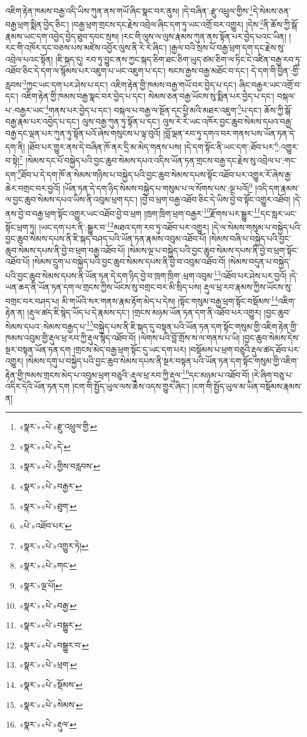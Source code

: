 འཇིག་རྟེན་ཁམས་བརྒྱ་འདི་ཡིས་ཀུན་ནས་གཡོ་ཞིང་སྣང་བར་ནུས། །དེ་བཞིན་:རྫུ་འཕྲུལ་གྱིས་\footnote{«སྣར་»«པེ་»རྫུ་འཕྲུལ་གྱི་}དེ་སེམས་ཅན་བརྒྱ་ཕྲག་སྨིན་བྱེད་ཅིང་། །བརྒྱ་ཕྲག་གྲངས་དང་རྗེས་འབྲེལ་ཞིང་དག་ཏུ་ཡང་འགྲོ་བར་འགྱུར། །དེས་\footnote{«སྣར་»«པེ་»དེ་}ནི་ཆོས་ཀྱི་སྒོ་རྣམས་ཡང་དག་འབྱེད་བྱེད་ཐུབ་དབང་སྲས། །རང་གི་ལུས་ལ་ལུས་རྣམས་ཀུན་ནས་སྟོན་པར་བྱེད་པའང་ཡིན། །རང་གི་འཁོར་དང་བཅས་པས་མཛེས་འབྱོར་ལུས་ནི་རེ་རེ་ཞིང་། །རྒྱལ་བའི་སྲས་པོ་བརྒྱ་ཕྲག་དག་དང་རྗེས་སུ་འབྲེལ་པའང་སྟོན། །ཇི་སྐད་དུ། རབ་ཏུ་བྱུང་ནས་ཀྱང་སྐད་ཅིག་ཐང་ཅིག་ཡུད་ཙམ་ཅིག་ལ་ཏིང་ངེ་འཛིན་བརྒྱ་རབ་ཏུ་འཐོབ་ཅིང་དེ་དག་ལ་སྙོམས་པར་འཇུག་པ་ཡང་འཇུག་པ་དང་། སངས་རྒྱས་བརྒྱ་མཐོང་བ་དང་། དེ་དག་གི་བྱིན་:གྱི་རླབས་\footnote{«སྣར་»«པེ་»གྱིས་བརླབས་}ཀྱང་ཡང་དག་པར་ཤེས་པ་དང་། འཇིག་རྟེན་གྱི་ཁམས་བརྒྱ་གཡོ་བར་བྱེད་པ་དང་། ཞིང་བརྒྱར་ཡང་འགྲོ་བ་དང་། འཇིག་རྟེན་གྱི་ཁམས་བརྒྱ་སྣང་བར་བྱེད་པ་དང་། སེམས་ཅན་བརྒྱ་ཡོངས་སུ་སྨིན་པར་བྱེད་པ་དང་། བསྐལ་པ་:བརྒྱར་ཡང་\footnote{«སྣར་»«པེ་»བརྒྱར་}གནས་པར་བྱེད་པ་དང་། བསྐལ་པ་བརྒྱ་ལ་སྔོན་དང་ཕྱི་མའི་མཐར་འཇུག་\footnote{«སྣར་»«པེ་»ཐུག་}པ་དང་། ཆོས་ཀྱི་སྒོ་བརྒྱ་རྣམ་པར་འབྱེད་པ་དང་། ལུས་བརྒྱ་ཀུན་ཏུ་སྟོན་པ་དང་། ལུས་རེ་རེ་ཡང་འཁོར་བྱང་ཆུབ་སེམས་དཔའ་བརྒྱ་བརྒྱ་དང་ལྡན་པར་ཀུན་ཏུ་སྟོན་པའོ་ཞེས་གསུངས་པ་ལྟ་བུའོ། །བློ་ལྡན་རབ་ཏུ་དགའ་བར་གནས་པས་ཡོན་ཏན་དེ་དག་ནི། །ཐོབ་པར་གྱུར་ནས་དེ་བཞིན་ཁོ་ནར་དྲི་མ་མེད་གནས་པས། །དེ་དག་སྟོང་ནི་ཡང་དག་:ཐོབ་པར་\footnote{«པེ་»འཐོབ་པར་}:འགྱུར་བ་སྟེ།\footnote{«སྣར་»«པེ་»འགྱུར་ཏེ།} །སེམས་དང་པོ་བསྐྱེད་པའི་བྱང་ཆུབ་སེམས་དཔའ་འདིས་ཡོན་ཏན་གྲངས་བརྒྱ་དང་རྗེས་སུ་འབྲེལ་པ་:གང་དག་\footnote{«སྣར་»«པེ་»གང་}ཐོབ་པ་དེ་དག་ཁོ་ན་སེམས་གཉིས་པ་བསྐྱེད་པའི་བྱང་ཆུབ་སེམས་དཔས་སྟོང་འཐོབ་པར་འགྱུར་རོ་ཞེས་རྒྱ་ཆེར་བགྲང་བར་བྱའོ། །ཡོན་ཏན་དེ་དག་ཉིད་སེམས་བསྐྱེད་པ་གསུམ་པ་ལ་སོགས་པས་:ལྔ་པའོ།\footnote{«སྣར་»ལྔ་པོ།} །འདི་དག་རྣམས་ལ་བྱང་ཆུབ་སེམས་དཔའ་ཡིས་ནི་འབུམ་ཕྲག་དང་། །བྱེ་བ་ཕྲག་བརྒྱ་འཐོབ་ཅིང་དེ་ཡིས་བྱེ་བ་སྟོང་འགྱུར་འཐོབ། །དེ་ནས་བྱེ་བ་བརྒྱ་ཕྲག་སྟོང་འགྱུར་ཡང་འཐོབ་བྱེ་བ་ཕྲག །ཁྲག་ཁྲིག་ཕྲག་བརྒྱར་\footnote{«སྣར་»«པེ་»བརྒྱ་}རྫོགས་པར་སྒྱུར་\footnote{«སྣར་»«པེ་»བསྒྱུར་}དང་སླར་ཡང་སྟོང་ཕྲག་ཏུ། །ཡང་དག་པར་ནི་:སྒྱུར་བ་\footnote{«སྣར་»«པེ་»བསྒྱུར་བ་}མཐའ་དག་རབ་ཏུ་འཐོབ་པར་འགྱུར། །དེ་ལ་སེམས་གསུམ་པ་བསྐྱེད་པའི་བྱང་ཆུབ་སེམས་དཔས་ནི་ཇི་སྐད་བཤད་པའི་ཡོན་ཏན་རྣམས་འབུམ་འཐོབ་པོ། །སེམས་བཞི་པ་བསྐྱེད་པའི་བྱང་ཆུབ་སེམས་དཔས་ནི་བྱེ་བ་ཕྲག་བརྒྱ་འཐོབ་པོ། །སེམས་ལྔ་པ་བསྐྱེད་པའི་བྱང་ཆུབ་སེམས་དཔས་ནི་བྱེ་བ་ཕྲག་སྟོང་འཐོབ་པོ། །སེམས་དྲུག་པ་བསྐྱེད་པའི་བྱང་ཆུབ་སེམས་དཔས་ནི་བྱེ་བ་འབུམ་འཐོབ་བོ། །སེམས་བདུན་པ་བསྐྱེད་པའི་བྱང་ཆུབ་སེམས་དཔས་ནི་ཡོན་ཏན་དེ་དག་ཉིད་བྱེ་བ་ཁྲག་ཁྲིག་:ཕྲག་འབུམ་\footnote{«སྣར་»«པེ་»ཕྲག་}འཐོབ་པར་ཤེས་པར་བྱའོ། །དེ་ཡན་ཆད་ནི་ཡོན་ཏན་དག་ལ་གྲངས་ཀྱིས་ཡོངས་སུ་བགྲང་བར་མི་སྲིད་པས། རྡུལ་ཕྲ་རབ་རྣམས་ཀྱིས་ཡོངས་སུ་བགྲང་བར་བཤད་པ། མི་གཡོའི་སར་གནས་རྣམ་རྟོག་མེད་པ་དེས། །སྟོང་གསུམ་བརྒྱ་ཕྲག་སྟོང་བསྡོམས་\footnote{«སྣར་»«པེ་»སྡོམས་}འཇིག་རྟེན་ན། །རྡུལ་ཚད་ཇི་སྙེད་ཡོད་པ་དེ་རྣམས་དང་། །གྲངས་མཉམ་ཡོན་ཏན་དག་ནི་འཐོབ་པར་འགྱུར། །བྱང་ཆུབ་སེམས་དཔའ་:སེམས་བརྒྱད་པ་\footnote{«སྣར་»«པེ་»སེམས་}བསྐྱེད་པས་ནི་ཇི་སྐད་དུ་བསྟན་པའི་ཡོན་ཏན་དག་སྟོང་གསུམ་གྱི་འཇིག་རྟེན་གྱི་ཁམས་འབུམ་གྱི་རྡུལ་ཕྲ་རབ་ཀྱི་རྡུལ་སྙེད་འཐོབ་བོ། །ལེགས་པའི་བློ་གྲོས་ས་ལ་གནས་པ་ཡི། །བྱང་ཆུབ་སེམས་དེས་སྔར་བསྟན་ཡོན་ཏན་དག །གྲངས་མེད་བརྒྱ་ཕྲག་སྟོང་དུ་ཡང་དག་པར། །བསྡོམས་པ་ཕྲག་བཅུའི་རྡུལ་ཚད་ཐོབ་པར་འགྱུར། །སེམས་དགུ་པ་བསྐྱེད་པའི་བྱང་ཆུབ་སེམས་དཔས་ནི་སྔར་བསྟན་པའི་ཡོན་ཏན་དག་སྟོང་གསུམ་གྱི་འཇིག་རྟེན་གྱི་ཁམས་གྲངས་མེད་པ་འབུམ་ཕྲག་བཅུའི་:རྡུལ་ཕྲ་རབ་ཀྱི་རྡུལ་\footnote{«སྣར་»«པེ་»རྡུལ་}དང་མཉམ་པ་འཐོབ་བོ། །རེ་ཞིག་བཅུ་པ་འདིར་དེའི་ཡོན་ཏན་དག །ངག་གི་སྤྱོད་ཡུལ་ལས་ཆེས་འདས་གྱུར་ཞིང་། །ངག་གི་སྤྱོད་ཡུལ་མ་ཡིན་བསྡོམས་རྣམས་ན། 